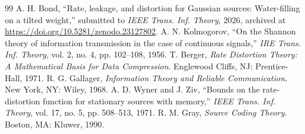 \documentclass[11pt,onecolumn]{IEEEtran}
\begin{document}
\begin{thebibliography}{99}
 A. H. Bond, ``Rate, leakage, and distortion for Gaussian
sources: Water-filling on a tilted weight,'' submitted to \emph{IEEE
Trans. Inf. Theory}, 2026, archived at
\url{https://doi.org/10.5281/zenodo.23127802}.
 A. N. Kolmogorov, ``On the Shannon theory of
information transmission in the case of continuous signals,'' \emph{IRE
Trans. Inf. Theory}, vol. 2, no. 4, pp. 102--108, 1956.
 T. Berger, \emph{Rate Distortion Theory: A Mathematical
Basis for Data Compression}. Englewood Cliffs, NJ: Prentice-Hall, 1971.
 R. G. Gallager, \emph{Information Theory and
Reliable Communication}. New York, NY: Wiley, 1968.
 A. D. Wyner and J. Ziv, ``Bounds on the
rate-distortion function for stationary sources with memory,''
\emph{IEEE Trans. Inf. Theory}, vol. 17, no. 5, pp. 508--513, 1971.
 R. M. Gray, \emph{Source Coding Theory}. Boston, MA:
Kluwer, 1990.

\end{thebibliography}
\end{document}

